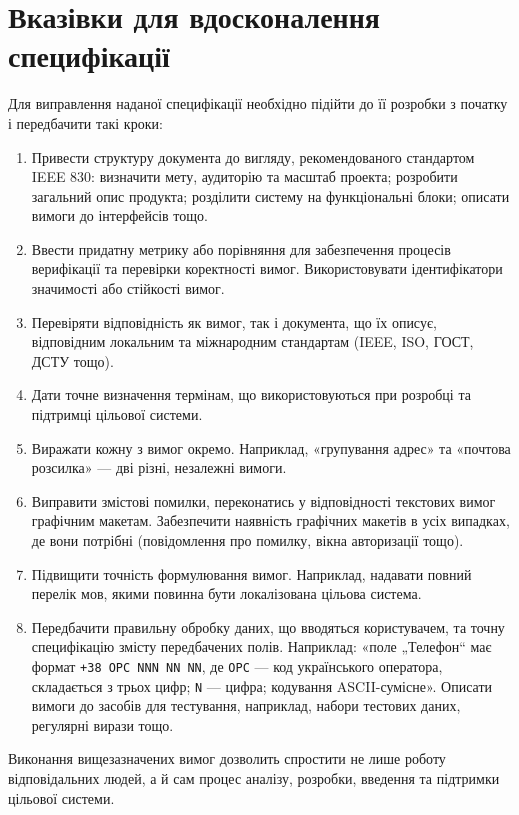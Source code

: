 \documentclass[a4paper,oneside,12pt,DIV=12,titlepage,toc]{scrartcl}
\begin{document}
		\section{Вказівки для вдосконалення специфікації}
			Для виправлення наданої специфікації необхідно підійти до її розробки з початку і передбачити такі кроки:
			\begin{enumerate}
				\item Привести структуру документа до вигляду, рекомендованого стандартом IEEE 830: визначити мету, аудиторію та масштаб проекта; розробити загальний опис продукта; розділити систему на функціональні блоки; описати вимоги до інтерфейсів тощо.
				\item Ввести придатну метрику або порівняння для забезпечення процесів верифікації та перевірки коректності вимог. Використовувати ідентифікатори значимості або стійкості вимог.
				\item Перевіряти відповідність як вимог, так і документа, що їх описує, відповідним локальним та міжнародним стандартам (IEEE, ISO, ГОСТ, ДСТУ тощо).
				\item Дати точне визначення термінам, що використовуються при розробці та підтримці цільової системи.
				\item Виражати кожну з вимог окремо. Наприклад, «групування адрес» та «почтова розсилка» --- дві різні, незалежні вимоги.
				\item Виправити змістові помилки, переконатись у відповідності текстових вимог графічним макетам. Забезпечити наявність графічних макетів в усіх випадках, де вони потрібні (повідомлення про помилку, вікна авторизації тощо).
				\item Підвищити точність формулювання вимог. Наприклад, надавати повний перелік мов, якими повинна бути локалізована цільова система.
				\item Передбачити правильну обробку даних, що вводяться користувачем, та точну специфікацію змісту передбачених полів. Наприклад: «поле „Телефон“ має формат \texttt{+38~OPC~NNN~NN~NN}, де \texttt{OPC} --- код українського оператора, складається з трьох цифр; \texttt{N} --- цифра; кодування ASCII-сумісне». Описати вимоги до засобів для тестування, наприклад, набори тестових даних, регулярні вирази тощо.
			\end{enumerate}
			
			Виконання вищезазначених вимог дозволить спростити не лише роботу відповідальних людей, а й сам процес аналізу, розробки, введення та підтримки цільової системи.
			
\end{document}
